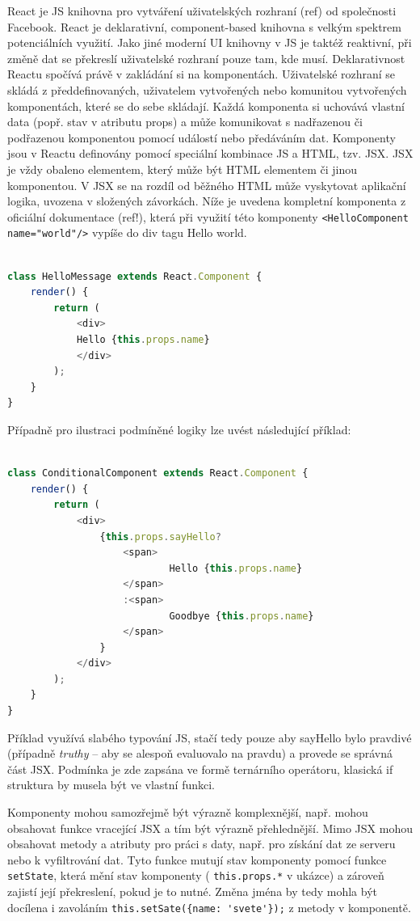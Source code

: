 
React je JS knihovna pro vytváření uživatelských rozhraní (ref) od společnosti Facebook. React je deklarativní, component-based knihovna s velkým spektrem potenciálních využití. Jako jiné moderní UI knihovny v JS je taktéž reaktivní, při změně dat se překreslí uživatelské rozhraní pouze tam, kde musí. Deklarativnost Reactu spočívá právě v zakládání si na komponentách. Uživatelské rozhraní se skládá z předdefinovaných, uživatelem vytvořených nebo komunitou vytvořených komponentách, které se do sebe skládají. Každá komponenta si uchovává vlastní data (popř. stav v atributu props) a může komunikovat s nadřazenou či podřazenou komponentou pomocí událostí nebo předáváním dat. Komponenty jsou v Reactu definovány pomocí speciální kombinace JS a HTML, tzv. JSX. JSX je vždy obaleno elementem, který může být HTML elementem či jinou komponentou. V JSX se na rozdíl od běžného HTML může vyskytovat aplikační logika, uvozena v složených závorkách.  Níže je uvedena kompletní komponenta z oficiální dokumentace (ref!), která při využití této komponenty \verb|<HelloComponent name="world"/>| vypíše do div tagu Hello world.

\begin{lstlisting}[language=JavaScript, caption=React komponenta]

class HelloMessage extends React.Component {
	render() {
		return (
			<div>
			Hello {this.props.name}
			</div>
		);
	}
}
\end{lstlisting}

Případně pro ilustraci podmíněné logiky lze uvést následující příklad:

\begin{lstlisting}[language=JavaScript, caption=React komponenta s podmínkou]

class ConditionalComponent extends React.Component {
	render() {
		return (
			<div>
				{this.props.sayHello?
					<span>
							Hello {this.props.name}
					</span>
					:<span>
							Goodbye {this.props.name}
					</span>
				}
			</div>
		);
	}
}
\end{lstlisting}

Příklad využívá slabého typování JS, stačí tedy pouze aby sayHello bylo pravdivé (případně \emph{truthy} -- aby se alespoň evaluovalo na pravdu) a provede se správná část JSX. Podmínka je zde zapsána ve formě ternárního operátoru, klasická if struktura by musela být ve vlastní funkci.

Komponenty mohou samozřejmě být výrazně komplexnější, např. mohou obsahovat funkce vracející JSX a tím být výrazně přehlednější. Mimo JSX mohou obsahovat metody a atributy pro práci s daty, např. pro získání dat ze serveru nebo k vyfiltrování dat. Tyto funkce mutují stav komponenty pomocí funkce  \verb|setState|, která mění stav komponenty ( \verb|this.props.*| v ukázce) a zároveň zajistí její překreslení, pokud je to nutné. Změna jména by tedy mohla být docílena i zavoláním \verb|this.setSate({name: 'svete'});| z metody v komponentě.

